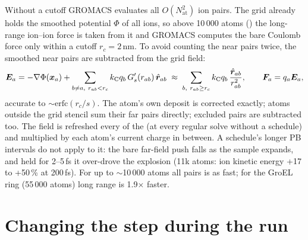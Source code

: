 Without a cutoff GROMACS evaluates all $O(N_{\mathrm{at}}^2)$ ion pairs.
The grid already holds the smoothed potential $\Phi$ of all ions, so above 10\,000 atoms
() the long-range ion--ion force is taken from it and GROMACS computes the bare Coulomb
force only within a cutoff $r_c = 2$\,nm.
To avoid counting the near pairs twice, the smoothed near pairs are subtracted from the grid field:
\begin{equation}
  \bm{E}_a = -\nabla\Phi(\bm{x}_a) + \sum_{b\ne a,\ r_{ab}<r_c}k_{\mathrm C} q_b\,G_s'(r_{ab})\,\hat{\bm{r}}_{ab}
  \;\approx\;\sum_{b,\ r_{ab}\ge r_c}k_{\mathrm C} q_b\,\frac{\hat{\bm{r}}_{ab}}{r_{ab}^2},\qquad \bm{F}_a = q_a\bm{E}_a,
\end{equation}
accurate to $\sim\mathrm{erfc}(r_c/s)$.
The atom's own deposit is corrected exactly; atoms outside the grid stencil sum their far pairs directly; excluded pairs
are subtracted too.
The field is refreshed every  of the  (at every regular solve without a schedule)
and multiplied by each atom's current charge in between.
A schedule's longer PB intervals do not apply to it: the bare far-field push falls as the sample expands, and held
for 2--5\,fs it over-drove the explosion (11k atoms: ion kinetic energy +17 to +50\,\% at 200\,fs).
For up to $\sim$10\,000 atoms all pairs is as fast; for the GroEL ring (55\,000 atoms) long range is 1.9$\times$ faster.

\section{Changing the step during the run}
\label{sec:schedule-num}

